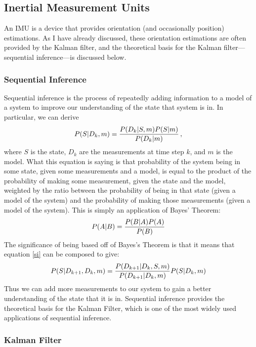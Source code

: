 \documentclass[12pt]{article}
\begin{document}
\subsection{Inertial Measurement Units}

An IMU is a device that provides orientation (and occasionally position) estimations. As I have already discussed, these orientation estimations are often provided by the Kalman filter, and the theoretical basis for the Kalman filter---sequential inference---is discussed below.

\subsubsection{Sequential Inference}

Sequential inference \cite{morrison_2016} is the process of repeatedly adding information to a model of a system to improve our understanding of the state that system is in. In particular, we can derive
\begin{equation}
	\label{si}
	P(S | D_k, m) = {P(D_k | S, m) P(S | m) \over P(D_k | m)}\,,
\end{equation}
where $S$ is the state, $D_k$ are the measurements at time step $k$, and $m$ is the model. What this equation is saying is that probability of the system being in some state, given some measurements and a model, is equal to the product of the probability of making some measurement, given the state and the model, weighted by the ratio between the probability of being in that state (given a model of the system) and the probability of making those measurements (given a model of the system). This is simply an application of Bayes' Theorem:
\begin{equation}
	P(A | B) = {P(B|A) P(A) \over P(B)}
\end{equation}
The significance of being based off of Bayes's Theorem is that it means that equation \ref{si} can be composed to give:
\begin{equation}
	P(S|D_{k+1},D_k,m) = {P(D_{k+1}|D_k,S,m) \over P(D_{k+1}|D_k,m)} P(S | D_k, m)
\end{equation}
Thus we can add more measurements to our system to gain a better understanding of the state that it is in. Sequential inference provides the theoretical basis for the Kalman Filter, which is one of the most widely used applications of sequential inference.

\subsubsection{Kalman Filter}
\end{document}
